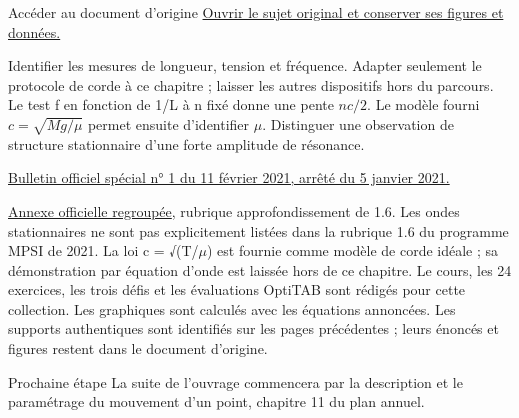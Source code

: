 \begin{loi}{Accéder au document d’origine}
\href{https://www.physagreg.fr/agreg-montage-physique-36-ondes-stationnaires.php}{Ouvrir le sujet original et conserver ses figures et données.}
\end{loi}
Identifier les mesures de longueur, tension et fréquence. Adapter seulement le protocole de corde à ce chapitre ; laisser les autres dispositifs hors du parcours.
Le test f en fonction de 1/L à n fixé donne une pente $nc/2$. Le modèle fourni $c=\sqrt{Mg/\mu}$ permet ensuite d’identifier \ensuremath{\mu}. Distinguer une observation de structure stationnaire d’une forte amplitude de résonance.

\href{https://www.education.gouv.fr/bo/21/Special1/ESRS2035779A.htm}{Bulletin officiel spécial n° 1 du 11 février 2021, arrêté du 5 janvier 2021.}\par
\href{https://cache.media.education.gouv.fr/file/SPE1-MEN-MESRI-4-2-2021/64/8/spe779_annexe_1373648.pdf}{Annexe officielle regroupée}, rubrique approfondissement de 1.6. Les ondes stationnaires ne sont pas explicitement listées dans la rubrique 1.6 du programme MPSI de 2021. La loi c = √(T/\ensuremath{\mu}) est fournie comme modèle de corde idéale ; sa démonstration par équation d’onde est laissée hors de ce chapitre.
Le cours, les 24 exercices, les trois défis et les évaluations OptiTAB sont rédigés pour cette collection. Les graphiques sont calculés avec les équations annoncées. Les supports authentiques sont identifiés sur les pages précédentes ; leurs énoncés et figures restent dans le document d’origine.
\begin{methode}{Prochaine étape}
La suite de l’ouvrage commencera par la description et le paramétrage du mouvement d’un point, chapitre 11 du plan annuel.
\end{methode}

